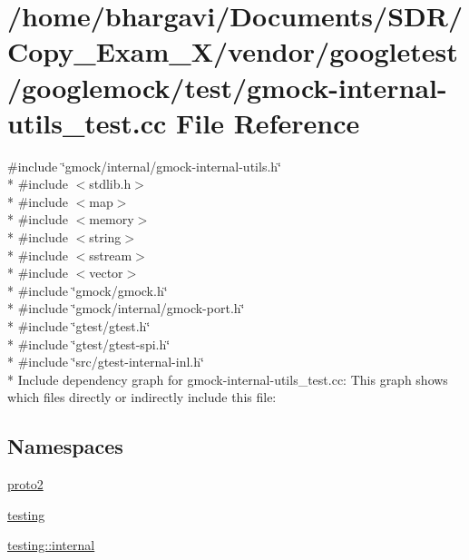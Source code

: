 \hypertarget{gmock-internal-utils__test_8cc}{}\section{/home/bhargavi/\+Documents/\+S\+D\+R/\+Copy\+\_\+\+Exam\+\_\+X/vendor/googletest/googlemock/test/gmock-\/internal-\/utils\+\_\+test.cc File Reference}
\label{gmock-internal-utils__test_8cc}
{\ttfamily \#include \char`\"{}gmock/internal/gmock-\/internal-\/utils.\+h\char`\"{}}\\*
{\ttfamily \#include $<$stdlib.\+h$>$}\\*
{\ttfamily \#include $<$map$>$}\\*
{\ttfamily \#include $<$memory$>$}\\*
{\ttfamily \#include $<$string$>$}\\*
{\ttfamily \#include $<$sstream$>$}\\*
{\ttfamily \#include $<$vector$>$}\\*
{\ttfamily \#include \char`\"{}gmock/gmock.\+h\char`\"{}}\\*
{\ttfamily \#include \char`\"{}gmock/internal/gmock-\/port.\+h\char`\"{}}\\*
{\ttfamily \#include \char`\"{}gtest/gtest.\+h\char`\"{}}\\*
{\ttfamily \#include \char`\"{}gtest/gtest-\/spi.\+h\char`\"{}}\\*
{\ttfamily \#include \char`\"{}src/gtest-\/internal-\/inl.\+h\char`\"{}}\\*
Include dependency graph for gmock-\/internal-\/utils\+\_\+test.cc\+:
This graph shows which files directly or indirectly include this file\+:
\subsection*{Namespaces}
\begin{DoxyCompactItemize}
\item 
 \hyperlink{namespaceproto2}{proto2}
\item 
 \hyperlink{namespacetesting}{testing}
\item 
 \hyperlink{namespacetesting_1_1internal}{testing\+::internal}
\end{DoxyCompactItemize}
